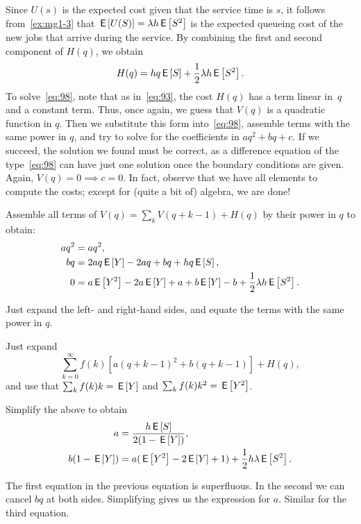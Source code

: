 Since $U(s)$ is the expected cost given that the service time is $s$, it follows from~\cref{ex:mg1-3} that $\,\mathsf{E}\left[U(S)\right] = \lambda h \,\mathsf{E}\left[S^2\right]$ is the expected queueing cost of the new jobs that arrive during the service. By combining the first and second component of $H(q)$, we obtain
\begin{equation*}
  H(q) = h q \,\mathsf{E}\left[S\right] + \frac 12 \lambda h \,\mathsf{E}\left[S^2\right].
\end{equation*}
To solve~\cref{eq:98}, note that as in~\cref{eq:93}, the cost $H(q)$ has a term linear in~$q$ and a constant term.
Thus, once again, we guess that $V(q)$ is a quadratic function in $q$.
Then we substitute this form into~\cref{eq:98}, assemble terms with the same power in $q$, and try to solve for the coefficients in $aq^2 + bq+c$.
If we succeed, the solution we found must be correct, as a difference equation of the type~\cref{eq:98} can have just one solution once the boundary conditions are given.
Again, $V(q)=0 \implies c = 0$.
In fact, observe that we have all elements to compute the costs; except for (quite a bit of) algebra, we are done!

\begin{extra}
Assemble all terms of $V(q) = \sum_k V(q+k-1) + H(q)$ by their power in $q$ to obtain:
\begin{align*}
  a q^2 &= a q^2, \\
  b q &= 2a q \,\mathsf{E}\left[Y\right] - 2a q + b q + h q \,\mathsf{E}\left[S\right],\\
  0 &= a \,\mathsf{E}\left[Y^2\right] - 2a \,\mathsf{E}\left[Y\right] + a + b \,\mathsf{E}\left[Y\right] - b + \frac 12 \lambda h \,\mathsf{E}\left[S^2\right].
\end{align*}
\begin{hint}
  Just expand the left- and right-hand sides, and equate the terms with the same power in $q$.
\end{hint}
\begin{solution}
  Just expand
  \begin{equation*}
    \sum_{k=0}^\infty f(k)[ a(q+k-1)^2 + b(q+k-1)] + H(q),
  \end{equation*}
  and use that $\sum_k f(k) k = \,\mathsf{E}\left[Y\right]$ and $\sum_k f(k) k^2 = \,\mathsf{E}\left[Y^2\right]$. 
\end{solution}
\end{extra}

\begin{extra}
Simplify the above to obtain
\begin{align*}
  a &= \frac{h \,\mathsf{E}\left[S\right]}{2(1-\,\mathsf{E}\left[Y\right])}, \\
  b(1-\,\mathsf{E}\left[Y\right]) &= a(\,\mathsf{E}\left[Y^2\right] - 2 \,\mathsf{E}\left[Y\right] + 1) + \frac 12 h \lambda \,\mathsf{E}\left[S^2\right].
\end{align*}
\begin{solution}
  The first equation in the previous equation is superfluous.
  In the second we can cancel $bq$ at both sides.
  Simplifying gives us the expression for $a$.
  Similar for the third equation.
\end{solution}
\end{extra}

